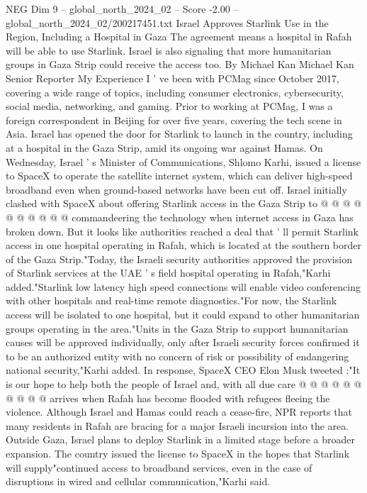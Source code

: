 \begin{textsample}{NEG Dim 9 – global\_north\_2024\_02 – Score -2.00 – global\_north\_2024\_02/200217451.txt}  \label{ex:f9_neg_242}
Israel Approves Starlink Use in the Region, Including a Hospital in Gaza The agreement means a hospital in Rafah will be able to use Starlink.
Israel is also signaling that more humanitarian groups in Gaza Strip could receive the access too.
By Michael Kan Michael Kan Senior Reporter My Experience I ' ve been with PCMag since October 2017, covering a wide range of topics, including consumer electronics, cybersecurity, social media, networking, and gaming.
Prior to working at PCMag, I was a foreign correspondent in Beijing for over five years, covering the tech scene in Asia.
Israel has opened the door for Starlink to launch in the country, including at a hospital in the Gaza Strip, amid its ongoing war against Hamas.
On Wednesday, Israel ' s Minister of Communications, Shlomo Karhi, issued a license to SpaceX to operate the satellite internet system, which can deliver high-speed broadband even when ground-based networks have been cut off.
Israel initially clashed with SpaceX about offering Starlink access in the Gaza Strip to @ @ @ @ @ @ @ @ @ @ commandeering the technology when internet access in Gaza has broken down.
But it looks like authorities reached a deal that ' ll permit Starlink access in one hospital operating in Rafah, which is located at the southern border of the Gaza Strip."Today, the Israeli security authorities approved the provision of Starlink services at the UAE ' s field hospital operating in Rafah,"Karhi added."Starlink low latency high speed connections will enable video conferencing with other hospitals and real-time remote diagnostics."For now, the Starlink access will be isolated to one hospital, but it could expand to other humanitarian groups operating in the area."Units in the Gaza Strip to support humanitarian causes will be approved individually, only after Israeli security forces confirmed it to be an authorized entity with no concern of risk or possibility of endangering national security,"Karhi added.
In response, SpaceX CEO Elon Musk tweeted :"It is our hope to help both the people of Israel and, with all due care @ @ @ @ @ @ @ @ @ @ arrives when Rafah has become flooded with refugees fleeing the violence.
Although Israel and Hamas could reach a cease-fire, NPR reports that many residents in Rafah are bracing for a major Israeli incursion into the area.
Outside Gaza, Israel plans to deploy Starlink in a limited stage before a broader expansion.
The country issued the license to SpaceX in the hopes that Starlink will supply"continued access to broadband services, even in the case of disruptions in wired and cellular communication,"Karhi said.

\end{textsample}
